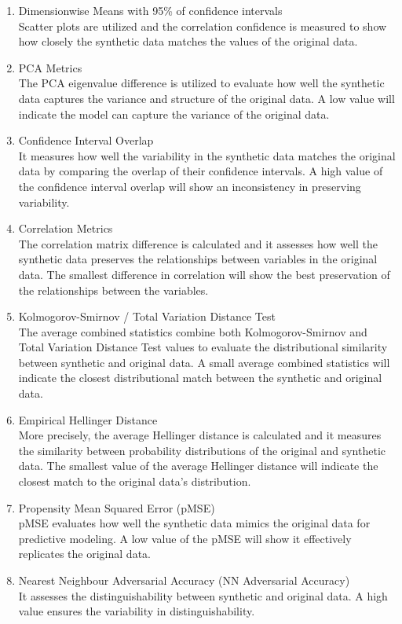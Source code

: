 \begin{enumerate}
    \item Dimensionwise Means with 95\% of confidence intervals \\
    Scatter plots are utilized and the correlation confidence is measured to show how closely the synthetic data matches the values of the original data. 

    \item PCA Metrics \\
    The PCA eigenvalue difference is utilized to evaluate how well the synthetic data captures the variance and structure of the original data. A low value will indicate the model can capture the variance of the original data.

    \item Confidence Interval Overlap \\
    It measures how well the variability in the synthetic data matches the original data by comparing the overlap of their confidence intervals. A high value of the confidence interval overlap will show an inconsistency in preserving variability.

    \item Correlation Metrics \\
    The correlation matrix difference is calculated and it assesses how well the synthetic data preserves the relationships between variables in the original data. The smallest difference in correlation will show the best preservation of the relationships between the variables.

    \item Kolmogorov-Smirnov / Total Variation Distance Test \\
    The average combined statistics combine both Kolmogorov-Smirnov and Total Variation Distance Test values to evaluate the distributional similarity between synthetic and original data. A small average combined statistics will indicate the closest distributional match between the synthetic and original data.

    \item Empirical Hellinger Distance \\
    More precisely, the average Hellinger distance is calculated and it measures the similarity between probability distributions of the original and synthetic data. The smallest value of the average Hellinger distance will indicate the closest match to the original data’s distribution.

    \item Propensity Mean Squared Error (pMSE) \\
    pMSE evaluates how well the synthetic data mimics the original data for predictive modeling. A low value of the pMSE will show it effectively replicates the original data.

    \item Nearest Neighbour Adversarial Accuracy (NN Adversarial Accuracy)\\
    It assesses the distinguishability between synthetic and original data. A high value ensures the variability in distinguishability.

\end{enumerate}




